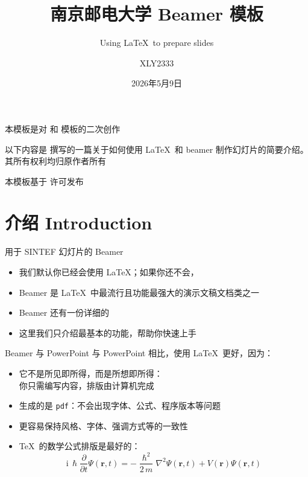 \documentclass{beamer}
\title{南京邮电大学 Beamer 模板}
\subtitle{Using \LaTeX\ to prepare slides}
\author{XLY2333}
\date{2026年5月9日}
\begin{document}
\maketitle

\begin{frame}
    本模板是对  和  模板的二次创作 \vspace{\baselineskip}

    以下内容是  撰写的一篇关于如何使用 \LaTeX\ 和 beamer 制作幻灯片的简要介绍。其所有权利均归原作者所有\vspace{\baselineskip}

    本模板基于  许可发布
\end{frame}

\section{介绍 Introduction}

\begin{frame}{用于 SINTEF 幻灯片的 Beamer}
    \begin{itemize}
        \item 我们默认你已经会使用 \LaTeX；如果你还不会，
        \item Beamer 是 \LaTeX\ 中最流行且功能最强大的演示文稿文档类之一
        \item Beamer 还有一份详细的
        \item 这里我们只介绍最基本的功能，帮助你快速上手
    \end{itemize}
\end{frame}

\begin{frame}{Beamer 与 PowerPoint}
    与 PowerPoint 相比，使用 \LaTeX\ 更好，因为：
    \begin{itemize}
        \item 它不是所见即所得，而是所想即所得：\\
              你只需编写内容，排版由计算机完成
        \item 生成的是 \texttt{pdf}：不会出现字体、公式、程序版本等问题
        \item 更容易保持风格、字体、强调方式等的一致性
        \item \TeX\ 的数学公式排版是最好的：
              \begin{equation*}
                  \mathrm{i}\,\hslash\frac{\partial}{\partial t} \Psi(\mathbf{r},t) =
                  -\frac{\hslash^2}{2\,m}\nabla^2\Psi(\mathbf{r},t)
                  + V(\mathbf{r})\Psi(\mathbf{r},t)
              \end{equation*}
    \end{itemize}
\end{frame}
\end{document}
